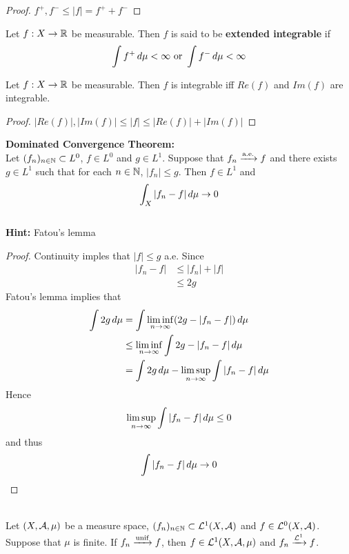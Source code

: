 \documentclass{book}
\begin{document}
	\begin{proof}
		$f^+,f^- \leq |f| = f^+ + f^-$
	\end{proof}
	
	\begin{defn}  
		Let $f:X \rightarrow \mathbb{R}$ be measurable. Then $f$ is said to be \textbf{extended integrable} if $$\int f^+ \, d \mu  < \infty \text{ or } \int f^- \, d \mu < \infty$$
	\end{defn}
	
	\begin{ex} 
		Let $f:X \rightarrow \mathbb{R}$ be measurable. Then $f$ is integrable iff $Re(f)$ and $Im(f)$ are integrable.
	\end{ex}
	
	\begin{proof}
		$|Re(f)|, |Im(f)| \leq |f| \leq |Re(f)| + |Im(f)|$
	\end{proof}
	
	\begin{ex}  \textbf{Dominated Convergence Theorem:}\\
		Let $(f_n)_{n \in \mathbb{N}} \subset L^0$, $f \in L^0$ and $g \in L^1$. Suppose that $f_n \xrightarrow{\text{a.e.}} f$ and there exists $g \in L^1$ such that for each $n \in \mathbb{N}$, $|f_n| \leq g$. Then $f \in L^1$ and $$\int_X |f_n - f| \, d \mu \rightarrow 0$$ \\
		\textbf{Hint:} Fatou's lemma
	\end{ex}
	
	\begin{proof}
	Continuity imples that $|f| \leq g$ a.e. Since 
	\begin{align*}
	|f_n - f| 
	&\leq |f_n| + |f| \\
	&\leq 2g
	\end{align*}	 
	Fatou's lemma implies that 
	\begin{align*}
	\int 2g \, d \mu 
	&= \int \liminf \limits_{n \rightarrow \infty} (2g - |f_n - f|) \, d \mu \\
	&\leq \liminf \limits_{n \rightarrow \infty} \int 2g - |f_n - f| \, d \mu  \\
	&= \int 2g \, d \mu - \limsup \limits_{n \rightarrow \infty} \int |f_n -f| \, d \mu \\
	\end{align*}
	Hence $$ \limsup \limits_{n \rightarrow \infty} \int |f_n -f| \, d \mu \leq 0 $$ and thus $$\int |f_n -f| \, d \mu \rightarrow 0$$
	\end{proof}

	\begin{ex}    \\
		Let $(X, \mathcal{A}, \mu)$ be a measure space, $(f_n)_{n \in \mathbb{N}} \subset \mathcal{L}^1(X, \mathcal{A})$ and $f \in \mathcal{L}^0(X, \mathcal{A})$. Suppose that $\mu$ is finite. If $f_n \xrightarrow{\text{unif}} f$, then $f \in \mathcal{L}^1(X, \mathcal{A}, \mu)$ and $f_n \xrightarrow{\mathcal{L}^1} f$.
	\end{ex}
	
\end{document}
